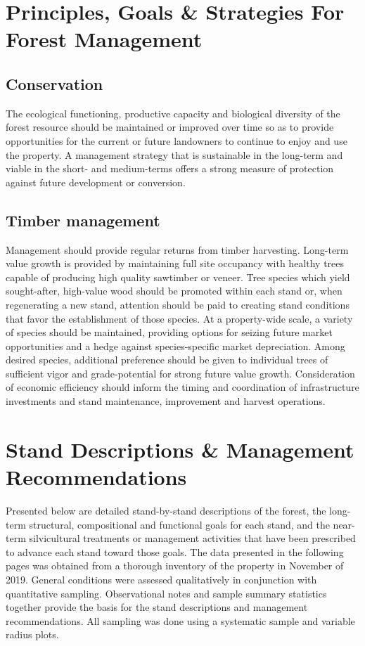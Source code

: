 \documentclass[]{tufte-handout}
\begin{document}
\section{Principles, Goals \& Strategies For Forest
Management}\label{principles-goals-strategies-for-forest-management}

\subsection{Conservation}\label{conservation}

The ecological functioning, productive capacity and biological diversity
of the forest resource should be maintained or improved over time so as
to provide opportunities for the current or future landowners to
continue to enjoy and use the property. A management strategy that is
sustainable in the long-term and viable in the short- and medium-terms
offers a strong measure of protection against future development or
conversion.

\subsection{Timber management}\label{timber-management}

Management should provide regular returns from timber harvesting.
Long-term value growth is provided by maintaining full site occupancy
with healthy trees capable of producing high quality sawtimber or
veneer. Tree species which yield sought-after, high-value wood should be
promoted within each stand or, when regenerating a new stand, attention
should be paid to creating stand conditions that favor the establishment
of those species. At a property-wide scale, a variety of species should
be maintained, providing options for seizing future market opportunities
and a hedge against species-specific market depreciation. Among desired
species, additional preference should be given to individual trees of
sufficient vigor and grade-potential for strong future value growth.
Consideration of economic efficiency should inform the timing and
coordination of infrastructure investments and stand maintenance,
improvement and harvest operations.

\section{Stand Descriptions \& Management
Recommendations}\label{stand-descriptions-management-recommendations}

Presented below are detailed stand-by-stand descriptions of the forest,
the long-term structural, compositional and functional goals for each
stand, and the near-term silvicultural treatments or management
activities that have been prescribed to advance each stand toward those
goals. The data presented in the following pages was obtained from a
thorough inventory of the property in November of 2019. General
conditions were assessed qualitatively in conjunction with quantitative
sampling. Observational notes and sample summary statistics together
provide the basis for the stand descriptions and management
recommendations. All sampling was done using a systematic sample and
variable radius plots.
\end{document}

